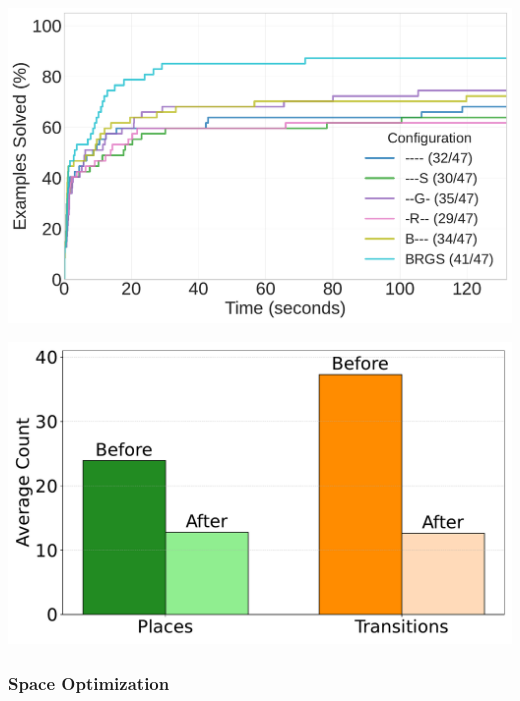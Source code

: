 \begin{center}
	\begin{minipage}[htbp]{0.48\textwidth}
		\centering
		\includegraphics[width=\linewidth]{figures/cactus_plot.pdf}
		\label{fig:timeout_cumulative_solved_log}
	\end{minipage}\hfill
	\begin{minipage}[htbp]{0.48\textwidth}
		\centering
		\includegraphics[width=\linewidth]{figures/petri_size_reduction_plot.pdf}
		\label{fig:petri_size_reduction}
	\end{minipage}
\end{center}



\subsubsection{Space Optimization}


